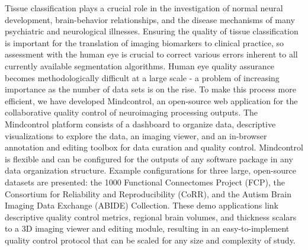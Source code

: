 Tissue classification plays a crucial role in the investigation of normal neural development, brain-behavior relationships, and the disease mechanisms of many psychiatric and neurological illnesses. Ensuring the quality of tissue classification is important for the translation of imaging biomarkers to clinical practice, so assessment with the human eye is crucial to correct various errors inherent to all currently available segmentation algorithms. Human eye quality assurance becomes methodologically difficult at a large scale - a problem of increasing importance as the number of data sets is on the rise. To make this process more efficient, we have developed Mindcontrol, an open-source web application for the collaborative quality control of neuroimaging processing outputs. The Mindcontrol platform consists of a dashboard to organize data, descriptive visualizations to explore the data, an imaging viewer, and an in-browser annotation and editing toolbox for data curation and quality control. Mindcontrol is flexible and can be configured for the outputs of any software package in any data organization structure. Example configurations for three large, open-source datasets are presented: the 1000 Functional Connectomes Project (FCP), the Consortium for Reliability and Reproducibility (CoRR), and the Autism Brain Imaging Data Exchange (ABIDE) Collection. These demo applications link descriptive quality control metrics, regional brain volumes, and thickness scalars to a 3D imaging viewer and editing module, resulting in an easy-to-implement quality control protocol that can be scaled for any size and complexity of study.